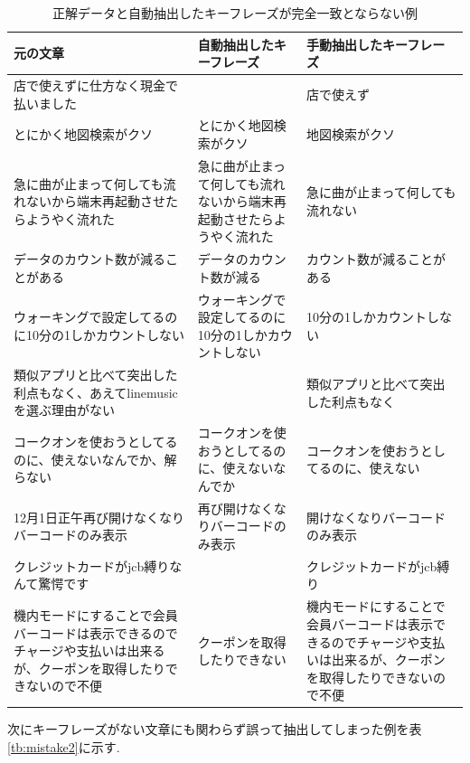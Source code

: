 \begin{table}[H]
  \caption{ 正解データと自動抽出したキーフレーズが完全一致とならない例 }
  \small
  \label{tb:mistake}
  \begin{center}
  \begin{tabularx}{\linewidth}{X|X|X}
    \hline
    元の文章&自動抽出したキーフレーズ&手動抽出したキーフレーズ\\\hline\hline
    店で使えずに仕方なく現金で払いました&&店で使えず\\\hline
    とにかく地図検索がクソ&とにかく地図検索がクソ&地図検索がクソ\\\hline
    急に曲が止まって何しても流れないから端末再起動させたらようやく流れた&急に曲が止まって何しても流れないから端末再起動させたらようやく流れた&急に曲が止まって何しても流れない\\\hline
    データのカウント数が減ることがある&データのカウント数が減る&カウント数が減ることがある\\\hline
    ウォーキングで設定してるのに10分の1しかカウントしない&ウォーキングで設定してるのに10分の1しかカウントしない&10分の1しかカウントしない\\\hline
    類似アプリと比べて突出した利点もなく、あえてlinemusicを選ぶ理由がない&&類似アプリと比べて突出した利点もなく\\\hline
    コークオンを使おうとしてるのに、使えないなんでか、解らない&コークオンを使おうとしてるのに、使えないなんでか&コークオンを使おうとしてるのに、使えない\\\hline
    12月1日正午再び開けなくなりバーコードのみ表示&再び開けなくなりバーコードのみ表示&開けなくなりバーコードのみ表示\\\hline
    クレジットカードがjcb縛りなんて驚愕です&&クレジットカードがjcb縛り\\\hline
    機内モードにすることで会員バーコードは表示できるのでチャージや支払いは出来るが、クーポンを取得したりできないので不便&クーポンを取得したりできない&機内モードにすることで会員バーコードは表示できるのでチャージや支払いは出来るが、クーポンを取得したりできないので不便\\\hline
  \end{tabularx}\end{center}
\end{table}

次にキーフレーズがない文章にも関わらず誤って抽出してしまった例を表\ref{tb:mistake2}に示す.

